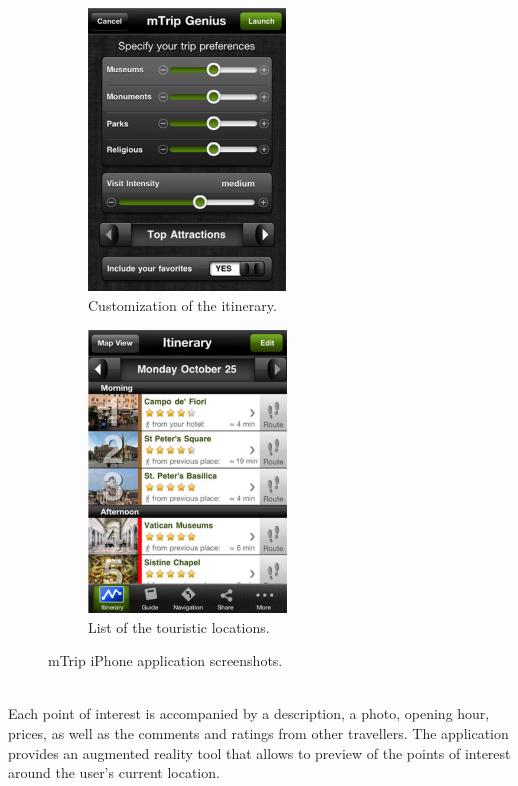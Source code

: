 \begin{figure}
        \centering
        \begin{subfigure}[b]{0.25\textwidth}
                \centering
                \includegraphics[height=7.5cm]{./images/screenshots/screenshot_mtrip_1.jpg}
                \caption{Customization of the itinerary.}
                \label{fig:mTripPreferencesCustomization}
        \end{subfigure}%
        \quad\quad\quad\quad\quad\quad
        \begin{subfigure}[b]{0.25\textwidth}
                \centering
                \includegraphics[height=7.5cm]{./images/screenshots/screenshot_mtrip_2.jpg}
                \caption{List of the touristic locations.}
                \label{fig:mTripTouisticLocations}
        \end{subfigure}
        \caption{mTrip iPhone application screenshots.}
        \label{fig:mtripScreenshots}
\end{figure}
\\
Each point of interest is accompanied by a description, a photo, opening hour, prices, as well as the comments and ratings from other travellers. The application provides an augmented reality tool that allows to preview of the points of interest around the user's current location.
